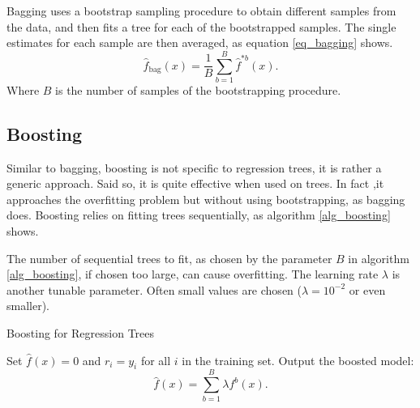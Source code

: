 \documentclass[a4paper,11pt]{article}
\begin{document}
Bagging uses a bootstrap sampling procedure to obtain different samples from the data, and then fits a tree for each of the bootstrapped samples. The single estimates for each sample are then averaged, as equation \ref{eq_bagging} shows. 
\begin{equation}
  \label{eq_bagging}
  \hat{f}_{\text{bag}}(x) = \frac{1}{B} \sum_{b=1}^{B} \hat{f}^{*b}(x).
\end{equation}
Where $B$ is the number of samples of the bootstrapping procedure.

\subsection{Boosting}

Similar to bagging, boosting is not specific to regression trees, it is rather a generic approach. Said so, it is quite effective when used on trees. In fact ,it approaches the overfitting problem but without using bootstrapping, as bagging does. Boosting relies on fitting trees sequentially, as algorithm \ref{alg_boosting} shows. 

The number of sequential trees to fit, as chosen by the parameter $B$ in algorithm  \ref{alg_boosting}, if chosen too large, can cause overfitting. The learning rate $\lambda$ is another tunable parameter. Often small values are chosen ($\lambda=10^{-2}$ or even smaller).

\begin{algorithm}
  \caption{Boosting for Regression Trees}
  \label{alg_boosting}
  \SetAlgoLined
  \DontPrintSemicolon
  
  Set $\hat{f}(x) = 0$ and $r_i = y_i$ for all $i$ in the training set.\;
  Output the boosted model:
  \begin{equation}
  \hat{f}(x) = \sum_{b=1}^B \lambda f^b(x).
  \end{equation}\;
  
\end{algorithm}
  
\end{document}
